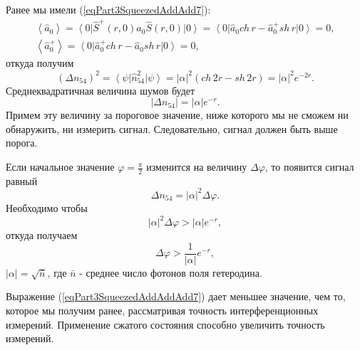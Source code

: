 Ранее мы имели (\ref{eqPart3SqueezedAddAdd7}):
\begin{eqnarray}
\left<\hat{a}_0\right> = 
\left<0\right|
\hat{S}^{+}\left(r, 0\right)
\hat{a}_0
\hat{S}\left(r, 0\right)
\left|0\right> = 
\left<0\right|
\hat{a}_0 ch\,r - \hat{a}_0^{+} sh\,r
\left|0\right> = 0,
\nonumber \\
\left<\hat{a}_0^{+}\right> = 
\left<0\right|
\hat{a}_0^{+} ch\,r - \hat{a}_0 sh\,r
\left|0\right> = 0,
\nonumber
\end{eqnarray}
откуда получим
\begin{equation}
\left(\Delta n_{54}\right)^2 = 
\left<\psi\right|\hat{n}_{54}^2\left|\psi\right> =
\left|\alpha\right|^2\left(
ch\,2r - sh\,2r
\right) = 
\left|\alpha\right|^2 e^{-2 r}.
\nonumber
\end{equation}
Среднеквадратичная величина шумов будет 
\[
\left|\Delta n_{54}\right| = 
\left|\alpha\right| e^{- r}.
\]
Примем эту величину за пороговое значение, ниже которого мы не сможем
ни обнаружить, ни измерить сигнал. Следовательно, сигнал должен быть
выше порога.

Если начальное значение $\varphi=\frac{\pi}{2}$ изменится на величину $\Delta
\varphi$, то появится сигнал равный
\[
\Delta n_{54} = 
\left|\alpha\right|^2
\Delta \varphi.
\]
Необходимо чтобы 
\[
\left|\alpha\right|^2
\Delta \varphi > 
\left|\alpha\right|
e^{-r},
\]
откуда получаем
\begin{equation}
\Delta \varphi >
\frac{1}{\left|\alpha\right|} e^{-r},
\label{eqPart3SqueezedAddAddAdd7}
\end{equation}
$\left|\alpha\right| = \sqrt{\bar{n}}$, где $\bar{n}$ - среднее число
фотонов поля гетеродина.

Выражение (\ref{eqPart3SqueezedAddAddAdd7}) дает меньшее значение, чем
то, которое мы получим ранее, рассматривая точность интерференционных
измерений. Применение сжатого состояния способно увеличить точность
измерений. 
